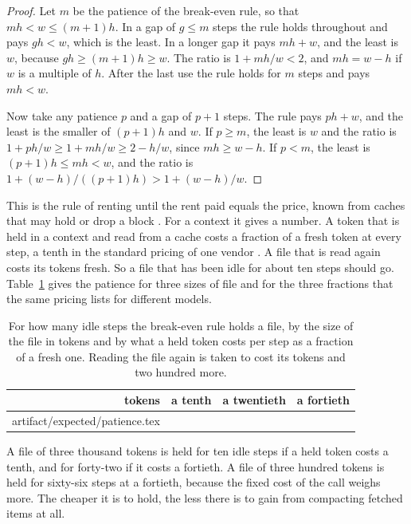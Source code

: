 \documentclass[acmsmall,nonacm,screen]{acmart}
\makeatletter
\newcommand{\claim}[2]{#2}
\newcommand{\rows}[1]{\@@input artifact/expected/#1.tex }
\makeatother
\begin{document}
\begin{proof}
Let $m$ be the patience of the break-even rule, so that $m h < w \le (m + 1) h$. In a gap of
$g \le m$ steps the rule holds throughout and pays $g h < w$, which is the least. In a longer
gap it pays $m h + w$, and the least is $w$, because $g h \ge (m + 1) h \ge w$. The ratio is
$1 + m h / w < 2$, and $m h = w - h$ if $w$ is a multiple of $h$. After the last use the rule
holds for $m$ steps and pays $m h < w$.

Now take any patience $p$ and a gap of $p + 1$ steps. The rule pays $p h + w$, and the least
is the smaller of $(p + 1) h$ and $w$. If $p \ge m$, the least is $w$ and the ratio is $1 +
p h / w \ge 1 + m h / w \ge 2 - h/w$, since $m h \ge w - h$. If $p < m$, the least is $(p +
1) h \le m h < w$, and the ratio is $1 + (w - h)/((p + 1) h) > 1 + (w - h)/w$.
\end{proof}

This is the rule of renting until the rent paid equals the price, known from caches that
may hold or drop a block \citep{Karlin1988}. For a context it gives a number. A token that
is held in a context and read from a cache costs a fraction of a fresh token at every step,
a tenth in the standard pricing of one vendor \citep{claudecaching}. A file that is read
again costs its tokens fresh. So a file that has been idle for about ten steps should go. Table~\ref{tab:patience} gives
the patience for three sizes of file and for the three fractions that the same pricing
lists for different models.

\begin{table}
\caption{For how many idle steps the break-even rule holds a file, by the size of the file
in tokens and by what a held token costs per step as a fraction of a fresh one. Reading the
file again is taken to cost its tokens and two hundred more.}\label{tab:patience}
\begin{tabular}{rrrr}
\toprule
tokens & a tenth & a twentieth & a fortieth \\
\midrule
\rows{patience}
\bottomrule
\end{tabular}
\end{table}

\claim{patience}{A file of three thousand tokens is held for ten idle steps if a held token
costs a tenth, and for forty-two if it costs a fortieth. A file of three hundred tokens is
held for sixty-six steps at a fortieth, because the fixed cost of the call weighs more.} The
cheaper it is to hold, the less there is to gain from compacting fetched items at all.
\end{document}
